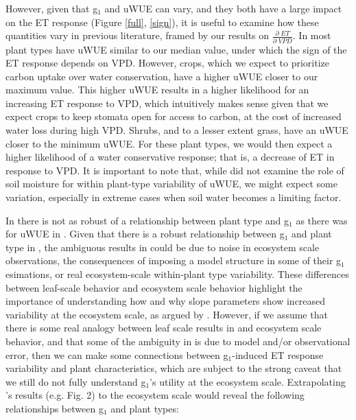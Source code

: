However, given that g$_1$ and uWUE can vary, and they both have a
large impact on the ET response (Figure \ref{full}, \ref{sign}), it is
useful to examine how these quantities vary in previous literature,
framed by our results on $\frac{\partial \; ET}{\partial \; VPD}$. In
\citet{Zhou_2015} most plant types have uWUE similar to our median
value, under which the sign of the ET response depends on
VPD. However, crops, which we expect to prioritize carbon uptake over
water conservation, have a higher uWUE closer to our maximum
value. This higher uWUE results in a higher likelihood for an
increasing ET response to VPD, which intuitively makes sense given
that we expect crops to keep stomata open for access to carbon, at the
cost of increased water loss during high VPD. Shrubs, and to a lesser
extent grass, have an uWUE closer to the minimum uWUE. For these plant
types, we would then expect a higher likelihood of a water
conservative response; that is, a decrease of ET in response to
VPD. It is important to note that, while \citet{Zhou_2015} did not
examine the role of soil moisture for within plant-type variability of
uWUE, we might expect some variation, especially in extreme cases when
soil water becomes a limiting factor.

In \citet{Medlyn_2017} there is not as robust of a relationship
between plant type and g$_1$ as there was for uWUE in
\citet{Zhou_2015}. Given that there is a robust relationship between
g$_1$ and plant type in \citet{Lin_2015}, the ambiguous results in
\citet{Medlyn_2017} could be due to noise in ecosystem scale
observations, the consequences of imposing a model structure in some
of their g$_1$ esimations, or real ecosystem-scale within-plant type
variability. These differences between leaf-scale behavior and
ecosystem scale behavior highlight the importance of understanding how
and why slope parameters show increased variability at the ecosystem
scale, as argued by \citet{Medlyn_2017}. However, if we assume that
there is some real analogy between leaf scale results in
\citet{Lin_2015} and ecosystem scale behavior, and that some of the
ambiguity in \citet{Medlyn_2017} is due to model and/or observational
error, then we can make some connections between g$_1$-induced ET
response variability and plant characteristics, which are subject to
the strong caveat that we still do not fully understand g$_1$'s
utility at the ecosystem scale. Extrapolating \citet{Lin_2015}'s
results (e.g. Fig. 2) to the ecosystem scale would reveal the
following relationships between g$_1$ and plant types:


